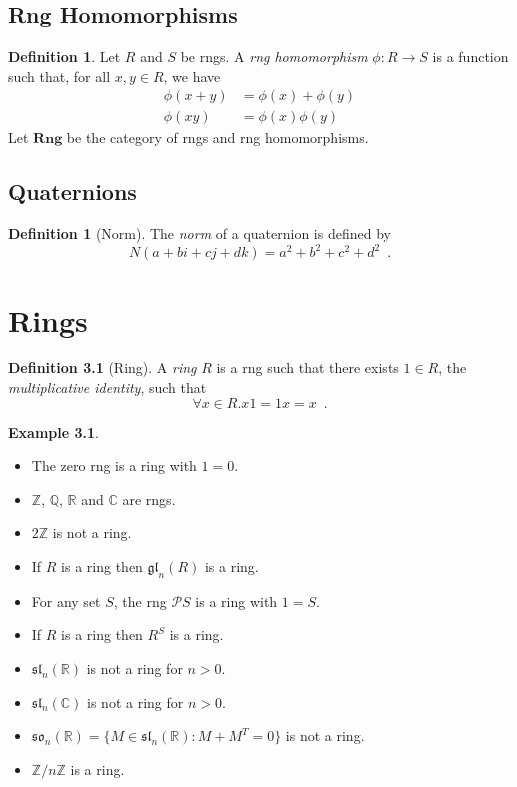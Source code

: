 \documentclass{book}
\theoremstyle{definition}
\newtheorem{df}[prop]{Definition}
\newtheorem{ex}[prop]{Example}
\newcommand{\gl}[2]{\ensuremath{\mathfrak{gl}_{#1} \left( {#2} \right)}}
\renewcommand{\sl}[2]{\ensuremath{\mathfrak{sl}_{#1} \left( {#2} \right)}}
\newcommand{\so}[2]{\ensuremath{\mathfrak{so}_{#1} \left( {#2} \right)}}
\begin{document}
\section{Rng Homomorphisms}

\begin{df}
Let $R$ and $S$ be rngs. A \emph{rng homomorphism} $\phi : R \rightarrow S$ is a function such that, for all $x,y \in R$, we have
\begin{align*}
\phi(x + y) & = \phi(x) + \phi(y) \\
\phi(xy) & = \phi(x) \phi(y)
\end{align*}
Let $\mathbf{Rng}$ be the category of rngs and rng homomorphisms.
\end{df}

\section{Quaternions}

\begin{df}[Norm]
The \emph{norm} of a quaternion is defined by
\[ N(a + bi + cj + dk) = a^2 + b^2 + c^2 + d^2 \enspace . \]
\end{df}

\chapter{Rings}

\begin{df}[Ring]
A \emph{ring} $R$ is a rng such that there exists $1 \in R$, the \emph{multiplicative identity}, such that
\[ \forall x \in R. x1 = 1x = x \enspace . \]
\end{df}

\begin{ex}
\begin{itemize}
\item The zero rng is a ring with $1 = 0$.
\item $\mathbb{Z}$, $\mathbb{Q}$, $\mathbb{R}$ and $\mathbb{C}$ are rngs.
\item $2 \mathbb{Z}$ is not a ring.
\item If $R$ is a ring then $\gl{n}{R}$ is a ring.
\item For any set $S$, the rng $\mathcal{P} S$ is a ring with $1 = S$.
\item If $R$ is a ring then $R^S$ is a ring.
\item $\sl{n}{\mathbb{R}}$ is not a ring for $n > 0$.
\item $\sl{n}{\mathbb{C}}$ is not a ring for $n > 0$.
\item $\so{n}{\mathbb{R}} = \{ M \in \sl{n}{\mathbb{R}} : M + M^T = 0 \}$ is not a ring.
\item $\mathbb{Z} / n \mathbb{Z}$ is a ring.
\end{itemize}
\end{ex}
\end{document}
